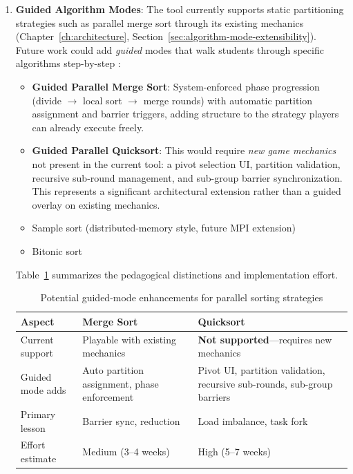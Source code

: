 \begin{enumerate}
    \item \textbf{Guided Algorithm Modes}: The tool currently supports static partitioning strategies such as parallel merge sort through its existing mechanics (Chapter~\ref{ch:architecture}, Section~\ref{sec:algorithm-mode-extensibility}). Future work could add \emph{guided} modes that walk students through specific algorithms step-by-step \citep{sanders2019sequential}:
          \begin{itemize}
              \item \textbf{Guided Parallel Merge Sort}: System-enforced phase progression (divide $\to$ local sort $\to$ merge rounds) with automatic partition assignment and barrier triggers, adding structure to the strategy players can already execute freely.
              \item \textbf{Guided Parallel Quicksort}: This would require \emph{new game mechanics} not present in the current tool: a pivot selection UI, partition validation, recursive sub-round management, and sub-group barrier synchronization. This represents a significant architectural extension rather than a guided overlay on existing mechanics.
              \item Sample sort (distributed-memory style, future MPI extension)
              \item Bitonic sort
          \end{itemize}

          Table~\ref{tab:future-algo-mode-comparison} summarizes the pedagogical distinctions and implementation effort.

          \begin{table}[htbp]
              \centering
              \caption{Potential guided-mode enhancements for parallel sorting strategies}
              \label{tab:future-algo-mode-comparison}
              \begin{tabular}{@{}p{3.5cm}p{5cm}p{5cm}@{}}
                  \toprule
                  \textbf{Aspect}  & \textbf{Merge Sort}                          & \textbf{Quicksort}                                                       \\
                  \midrule
                  Current support  & Playable with existing mechanics             & \textbf{Not supported}---requires new mechanics                          \\
                  Guided mode adds & Auto partition assignment, phase enforcement & Pivot UI, partition validation, recursive sub-rounds, sub-group barriers \\
                  Primary lesson   & Barrier sync, reduction                      & Load imbalance, task fork                                                \\
                  Effort estimate  & Medium (3--4 weeks)                          & High (5--7 weeks)                                                        \\
                  \bottomrule
              \end{tabular}
          \end{table}


\end{enumerate}
